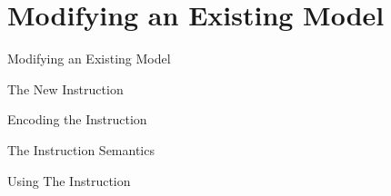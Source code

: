 \section{Modifying an Existing Model}
\begin{frame}{Modifying an Existing Model}

\end{frame}

\begin{frame}{The New Instruction}

\end{frame}

\begin{frame}{Encoding the Instruction}

\end{frame}

\begin{frame}{The Instruction Semantics}

\end{frame}

\begin{frame}{Using The Instruction}

\end{frame}
